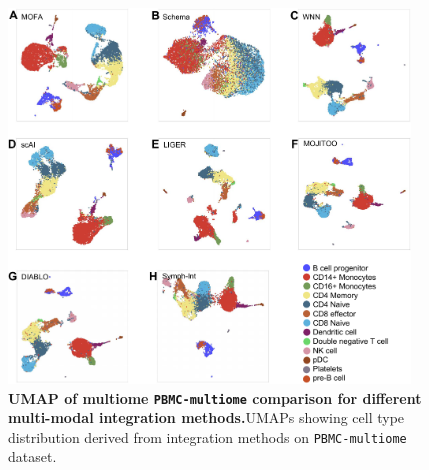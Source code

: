 \begin{figure}[!ht]
	\centering
	\includegraphics[width=0.95\textwidth]{pbmc_multiome_umap/fig}
	\vspace{0.1cm}
	\caption[UMAP of multiome PBMC comparison for different multi-modal integration methods.]{\textbf{UMAP of multiome \texttt{PBMC-multiome} comparison for different multi-modal integration methods.}UMAPs showing cell type distribution derived from integration methods on \texttt{PBMC-multiome} dataset. }
	\label{fig:pbmc_multiome_umap}
\end{figure}

